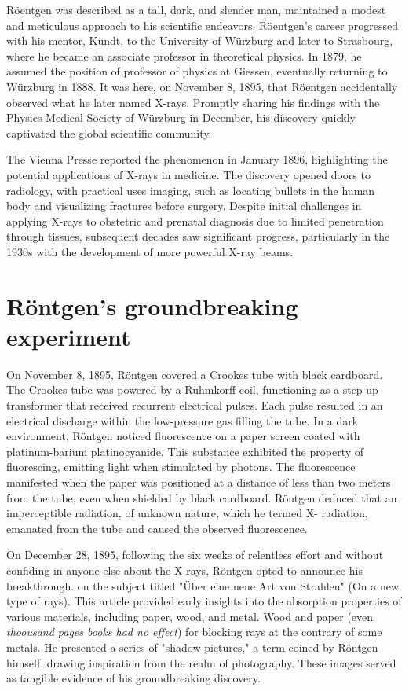 \documentclass[a4paper,12pt]{report}
\begin{document}
Röentgen was described as a tall, dark, and slender man, maintained a modest and meticulous
approach to his scientific endeavors. Röentgen's career progressed with his mentor, Kundt, to the
University of Würzburg and later to Strasbourg, where he became an associate professor in
theoretical physics. In 1879, he assumed the position of professor of physics at Giessen,
eventually returning to Würzburg in 1888. It was here, on November 8, 1895, that Röentgen
accidentally observed what he later named X-rays. Promptly sharing his findings with the
Physics-Medical Society of Würzburg in December, his discovery quickly captivated the global
scientific community.

The Vienna Presse reported the phenomenon in January 1896, highlighting the potential
applications of X-rays in medicine. The discovery opened doors to radiology, with practical uses
imaging, such as locating bullets in the human body and visualizing fractures before surgery.
Despite initial challenges in applying X-rays to obstetric  and prenatal diagnosis due to limited
penetration through tissues, subsequent decades saw significant progress, particularly in the
1930s with the development of more powerful X-ray beams.

\section{Röntgen's groundbreaking experiment}

On November 8, 1895, Röntgen covered a Crookes tube with black cardboard. The Crookes tube
was powered by a Ruhmkorff coil, functioning as a step-up transformer that received recurrent
electrical pulses. Each pulse resulted in an electrical discharge within the low-pressure gas filling
the tube. In a dark environment, Röntgen noticed fluorescence on a paper screen coated with
platinum-barium platinocyanide. This substance exhibited the property of fluorescing, emitting
light when stimulated by photons. The fluorescence manifested when the paper was positioned at
a distance of less than two meters from the tube, even when shielded by black cardboard.
Röntgen deduced that an imperceptible radiation, of unknown nature, which he termed X-
radiation, emanated from the tube and caused the observed fluorescence.


On December 28, 1895, following the six weeks of relentless effort and without confiding in
anyone else about the X-rays, Röntgen opted to announce his breakthrough. on the subject titled
"Über eine neue Art von Strahlen" (On a new type of rays). This article provided early insights
into the absorption properties of various materials, including paper, wood, and metal. Wood and paper (even \textit{thoousand pages books had no effect}) for blocking rays at the contrary of some metals. He
presented a series of "shadow-pictures," a term coined by Röntgen himself, drawing inspiration
from the realm of photography. These images served as tangible evidence of his groundbreaking
discovery.
\end{document}
